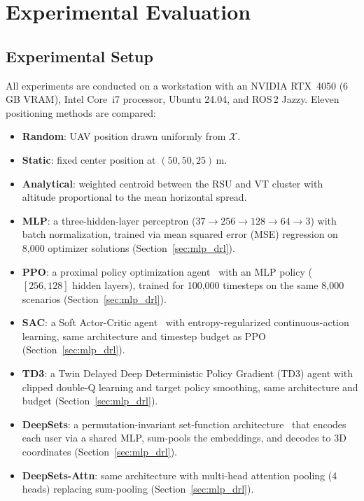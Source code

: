 \documentclass[journal]{IEEEtran}
\begin{document}
\section{Experimental Evaluation}
\label{sec:results}

\subsection{Experimental Setup}

All experiments are conducted on a workstation with an NVIDIA RTX~4050 (6\,GB VRAM), Intel Core~i7 processor, Ubuntu 24.04, and ROS\,2 Jazzy. Eleven positioning methods are compared:

\begin{itemize}
    \item \textbf{Random}: UAV position drawn uniformly from $\mathcal{X}$.
    \item \textbf{Static}: fixed center position at $(50, 50, 25)$\,m.
    \item \textbf{Analytical}: weighted centroid between the RSU and VT cluster with altitude proportional to the mean horizontal spread.
    \item \textbf{MLP}: a three-hidden-layer perceptron ($37 \to 256 \to 128 \to 64 \to 3$) with batch normalization, trained via mean squared error (MSE) regression on 8{,}000 optimizer solutions (Section~\ref{sec:mlp_drl}).
    \item \textbf{PPO}: a proximal policy optimization agent~\cite{schulman2017ppo} with an MLP policy ($[256, 128]$ hidden layers), trained for 100{,}000 timesteps on the same 8{,}000 scenarios (Section~\ref{sec:mlp_drl}).
    \item \textbf{SAC}: a Soft Actor-Critic agent~\cite{haarnoja2018sac} with entropy-regularized continuous-action learning, same architecture and timestep budget as PPO (Section~\ref{sec:mlp_drl}).
    \item \textbf{TD3}: a Twin Delayed Deep Deterministic Policy Gradient (TD3) agent with clipped double-Q learning and target policy smoothing, same architecture and budget (Section~\ref{sec:mlp_drl}).
    \item \textbf{DeepSets}: a permutation-invariant set-function architecture~\cite{zaheer2017deepsets} that encodes each user via a shared MLP, sum-pools the embeddings, and decodes to 3D coordinates (Section~\ref{sec:mlp_drl}).
    \item \textbf{DeepSets-Attn}: same architecture with multi-head attention pooling (4 heads) replacing sum-pooling (Section~\ref{sec:mlp_drl}).

\end{itemize}
\end{document}
